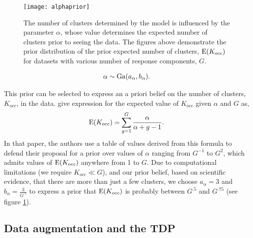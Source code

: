 {\begin{figure}
\texttt{[image: alphaprior]}
\caption{\small The number of clusters determined by the model is influenced by the parameter $\alpha$, whose value determines the expected number of clusters prior to seeing the data. The figures above demonstrate the prior distribution of the prior expected number of clusters, $\operatorname{E}(K_{occ})$ for datasets with various number of response components, $G$.}
\label{alphaprior}
\end{figure}

\begin{equation}
\alpha \sim \operatorname{Ga}(a_\alpha,b_\alpha).
\end{equation}

This prior can be selected to express an a priori belief on the number of clusters, $K_{occ}$, in the data. \citet{escobar1994} give expression for the expected value of $K_{occ}$ given $\alpha$ and $G$ as,
\begin{equation}
\operatorname{E}(K_{occ})=\sum_{g=1}^{G} \frac{\alpha}{\alpha + g - 1}.
\end{equation}
In that paper, the authors use a table of values derived from this formula to defend their proposal for a prior over values of $\alpha$ ranging from $G^{-1}$ to $G^{2}$, which admits values of $\operatorname{E}(K_{occ})$ anywhere from 1 to $G$. Due to computational limitations (we require $K_{occ} \ll G$), and our prior belief, based on scientific evidence, that there are more than just a few clusters, we choose $a_\alpha=3$ and $b_\alpha=\frac{3}{G^{.5}}$ to express a prior that $\operatorname{E}(K_{occ})$ is probably between $G^{.5}$ and $G^{.75}$ (see figure \ref{alphaprior}).

\subsection{Data augmentation and the TDP}
\label{subsec:reparam}

}
